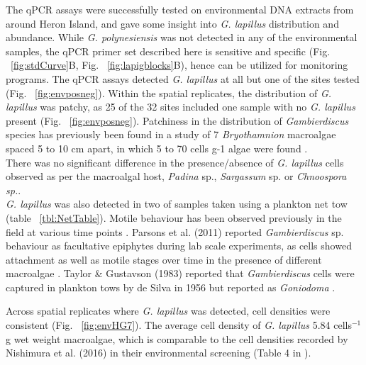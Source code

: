 \documentclass[12pt]{article}
\begin{document}
The qPCR assays were successfully tested on environmental DNA extracts from around Heron Island, and gave some insight into \emph{G. lapillus} distribution and abundance. While \emph{G. polynesiensis} was not detected in any of the environmental samples, the qPCR primer set described here is sensitive and specific (Fig. ~\ref{fig:stdCurve}B, Fig. ~\ref{fig:lapigblocks}B), hence can be utilized for monitoring programs.
The qPCR assays detected \emph{G. lapillus} at all but one of the sites tested (Fig. ~\ref{fig:envposneg}). Within the spatial replicates, the distribution of \emph{G. lapillus} was patchy, as 25 of the 32 sites included one sample with no \textit{G. lapillus} present (Fig. ~\ref{fig:envposneg}). Patchiness in the distribution of \textit{Gambierdiscus} species has previously been found in a study of 7 \emph{Bryothamnion} macroalgae spaced 5 to 10 cm apart, in which 5 to 70 cells g-1 algae were found \citep{taylor1986underwater}.\\
There was no significant difference in the presence/absence of \emph{G. lapillus} cells observed as per the macroalgal host, \emph{Padina} sp., \emph{Sargassum} sp. or \emph{Chnoospora sp.}.  \\
\emph{G. lapillus} was also detected in two of samples taken using a plankton net tow (table ~\ref{tbl:NetTable}). Motile behaviour has been observed previously in the field at various time points \citep{yasumoto1977finding,bomber1987ecology}. Parsons et al. (2011) reported \emph{Gambierdiscus} sp. behaviour as facultative epiphytes during lab scale experiments, as cells showed attachment as well as motile stages over time in the presence of different macroalgae \citep{parsons2011examination}. Taylor \& Gustavson (1983) reported that \emph{Gambierdiscus} cells were captured in plankton tows by de Silva in 1956 but reported as \emph{Goniodoma} \citep{taylor1986underwater}.

Across spatial replicates where \emph{G. lapillus} was detected, cell densities were consistent (Fig. ~\ref{fig:envHG7}). The average cell density of \emph{G. lapillus} 5.84 cells$^{-1}$g wet weight macroalgae, which is comparable to the cell densities recorded by Nishimura et al. (2016) in their environmental screening (Table 4 in \citep{nishimura2016quantitative}).\\
\end{document}
